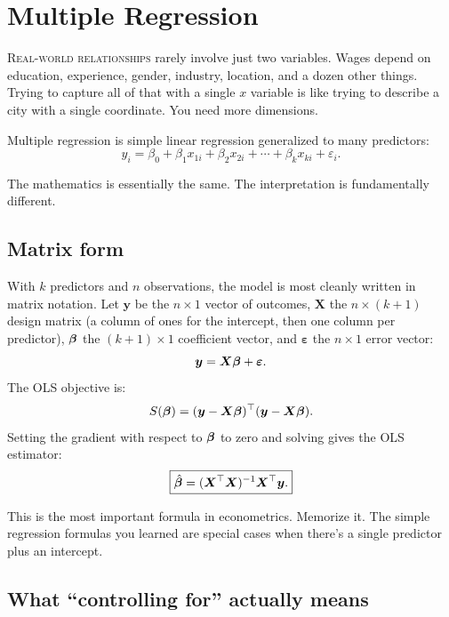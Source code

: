 \chapter{Multiple Regression}
\label{ch:multiple-regression}

\noindent\textsc{Real-world relationships} rarely involve just two variables. Wages depend on education, experience, gender, industry, location, and a dozen other things. Trying to capture all of that with a single $x$ variable is like trying to describe a city with a single coordinate. You need more dimensions.

Multiple regression is simple linear regression generalized to many predictors:
\begin{equation}
  y_i = \beta_0 + \beta_1 x_{1i} + \beta_2 x_{2i} + \cdots + \beta_k x_{ki} + \varepsilon_i.
  \label{eq:multiple-regression}
\end{equation}

The mathematics is essentially the same. The interpretation is fundamentally different.

\section{Matrix form}

With $k$ predictors and $n$ observations, the model is most cleanly written in matrix notation. Let $\bm{y}$ be the $n \times 1$ vector of outcomes, $\bm{X}$ the $n \times (k+1)$ design matrix (a column of ones for the intercept, then one column per predictor), $\bm{\beta}$ the $(k+1) \times 1$ coefficient vector, and $\bm{\varepsilon}$ the $n \times 1$ error vector:
\begin{equation}
  \bm{y} = \bm{X}\bm{\beta} + \bm{\varepsilon}.
\end{equation}
The OLS objective is:
\[
  S(\bm{\beta}) = (\bm{y} - \bm{X}\bm{\beta})^\top(\bm{y} - \bm{X}\bm{\beta}).
\]
Setting the gradient with respect to $\bm{\beta}$ to zero and solving gives the OLS estimator:
\begin{equation}
  \boxed{\hat{\bm{\beta}} = (\bm{X}^\top \bm{X})^{-1} \bm{X}^\top \bm{y}.}
  \label{eq:ols-matrix}
\end{equation}

This is the most important formula in econometrics. Memorize it. The simple regression formulas you learned are special cases when there's a single predictor plus an intercept.

\section{What ``controlling for'' actually means}

